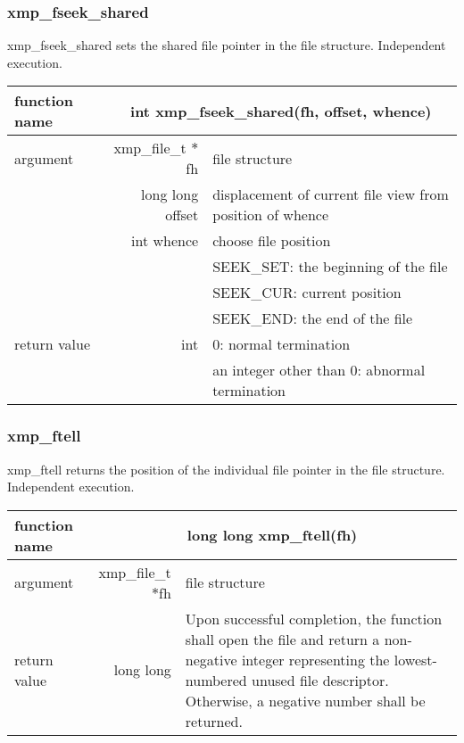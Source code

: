    \subsubsection{xmp\_fseek\_shared}
   xmp\_fseek\_shared sets the shared file pointer in the file structure. Independent execution.

   \begin{table}[h]
    \begin{center}
     \begin{tabular}{|l|r|p{80mm}|}
      \hline
      {\bf function name}  & \multicolumn{2}{c|}{\bf int xmp\_fseek\_shared(fh,
      offset, whence)}  \\ \hline \hline
      argument & xmp\_file\_t $*$fh & file structure \\ \cline{2-3}
      & long long offset & displacement of current file view from
	      position of whence \\ \cline{2-3}
      & int whence & choose file position \\
      &  & SEEK\_SET: the beginning of the file \\ 
      &  & SEEK\_CUR: current position \\ 
      &  & SEEK\_END: the end of the file \\ \hline
      return value & int & 0: normal termination \\
      &  & an integer other than 0: abnormal termination \\ \hline
      \end{tabular}
     \end{center}
   \end{table}

   \subsubsection{xmp\_ftell}
   xmp\_ftell returns the position of the individual file pointer in the file structure. Independent execution.

   \begin{table}[h]
    \begin{center}
     \begin{tabular}{|l|r|p{80mm}|}
      \hline
      {\bf function name}  & \multicolumn{2}{c|}{\bf long long
      xmp\_ftell(fh)} \\ \hline \hline
      argument & xmp\_file\_t $*$fh & file structure \\ \hline
      return value & long long & Upon successful completion, the
	      function shall open the file and return a non-negative
	      integer representing the lowest-numbered unused file
	      descriptor. Otherwise, a negative number shall be
	      returned. \\ \hline
      \end{tabular}
     \end{center}
   \end{table}

